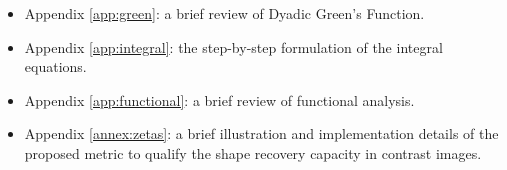 		\begin{itemize}
			\item Appendix \ref{app:green}: a brief review of Dyadic Green's Function.
			\item Appendix \ref{app:integral}: the step-by-step formulation of the integral equations.
			\item Appendix \ref{app:functional}: a brief review of functional analysis.
			\item Appendix \ref{annex:zetas}: a brief illustration and implementation details of the proposed metric to qualify the shape recovery capacity in contrast images.
		\end{itemize}
	
		
